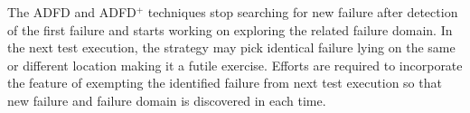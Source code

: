 The ADFD and ADFD$^+$ techniques stop searching for new failure after detection of the first failure and starts working on exploring the related failure domain. In the next test execution, the strategy may pick identical failure lying on the same or different location making it a futile exercise. Efforts are required to incorporate the feature of exempting the identified failure from next test execution so that new failure and failure domain is discovered in each time.\\





